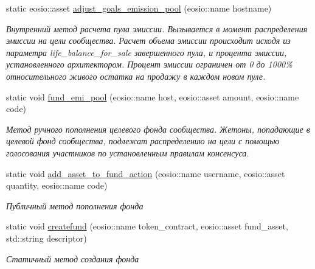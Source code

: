 \begin{DoxyCompactItemize}
static eosio\+::asset \mbox{\hyperlink{classunicore_ae4010919890b14f831b4d4a633771062}{adjust\+\_\+goals\+\_\+emission\+\_\+pool}} (eosio\+::name hostname)
\begin{DoxyCompactList}\small\item\em Внутренний метод расчета пула эмиссии. Вызывается в момент распределения эмиссии на цели сообщества. Расчет объема эмиссии происходит исходя из параметра life\+\_\+balance\+\_\+for\+\_\+sale завершенного пула, и процента эмиссии, установленного архитектором. Процент эмиссии ограничен от 0 до 1000\% относительного живого остатка на продажу в каждом новом пуле. \end{DoxyCompactList}\item 
static void \mbox{\hyperlink{classunicore_a416ca740d83132d969c0e99d035a5c7f}{fund\+\_\+emi\+\_\+pool}} (eosio\+::name host, eosio\+::asset amount, eosio\+::name code)
\begin{DoxyCompactList}\small\item\em Метод ручного пополнения целевого фонда сообщества. Жетоны, попадающие в целевой фонд сообщества, подлежат распределению на цели с помощью голосования участников по установленным правилам консенсуса. \end{DoxyCompactList}\item 
\mbox{\label{classunicore_aac61e7c884c079854b1987c88abce0c5}} 
static void \mbox{\hyperlink{classunicore_aac61e7c884c079854b1987c88abce0c5}{add\+\_\+asset\+\_\+to\+\_\+fund\+\_\+action}} (eosio\+::name username, eosio\+::asset quantity, eosio\+::name code)
\begin{DoxyCompactList}\small\item\em Публичный метод пополнения фонда \end{DoxyCompactList}\item 
\mbox{\label{classunicore_a2439f37a892708018e3474efa938d778}} 
static void \mbox{\hyperlink{classunicore_a2439f37a892708018e3474efa938d778}{createfund}} (eosio\+::name token\+\_\+contract, eosio\+::asset fund\+\_\+asset, std\+::string descriptor)
\begin{DoxyCompactList}\small\item\em Статичный метод создания фонда \end{DoxyCompactList}\item 
\mbox{\label{classunicore_ad50a4ce9c9910d11c914c01ba15f859c}} 

\end{DoxyCompactItemize}
